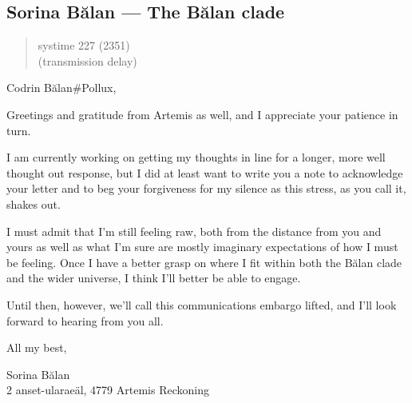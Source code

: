 \hypertarget{sorina-bux103lan-the-bux103lan-clade}{%
\subsection{Sorina Bălan — The Bălan clade}\label{sorina-bux103lan-the-bux103lan-clade}}

\begin{quote}
systime 227 (2351)\\
(transmission delay)
\end{quote}

Codrin Bălan\#Pollux,

Greetings and gratitude from Artemis as well, and I appreciate your patience in turn.

I am currently working on getting my thoughts in line for a longer, more well thought out response, but I did at least want to write you a note to acknowledge your letter and to beg your forgiveness for my silence as this stress, as you call it, shakes out.

I must admit that I'm still feeling raw, both from the distance from you and yours as well as what I'm sure are mostly imaginary expectations of how I must be feeling. Once I have a better grasp on where I fit within both the Bălan clade and the wider universe, I think I'll better be able to engage.

Until then, however, we'll call this communications embargo lifted, and I'll look forward to hearing from you all.

All my best,

Sorina Bălan\\
2 anset-ularaeäl, 4779 Artemis Reckoning
